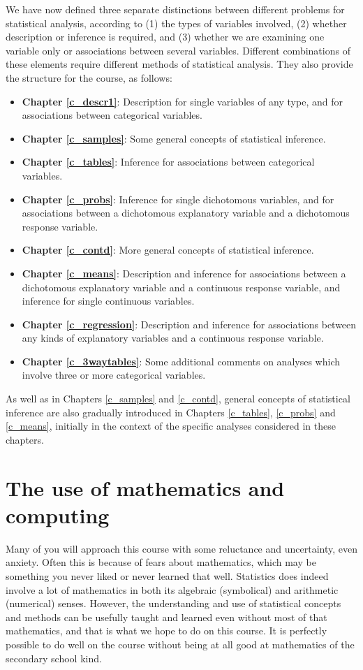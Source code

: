 We have now defined three separate distinctions between different
problems for statistical analysis, according to (1) the types of
variables involved, (2) whether description or inference is required,
and (3) whether we are examining one variable only or associations
between several variables. Different combinations of these elements
require different methods of statistical analysis. They also provide the
structure for the course, as follows:
\begin{itemize}
\item
\textbf{Chapter \ref{c_descr1}}: Description for single variables of any
type, and for associations between categorical variables.
\item
\textbf{Chapter \ref{c_samples}}: Some general concepts
of statistical inference.
\item
\textbf{Chapter \ref{c_tables}}:
Inference for associations between categorical variables.
\item
\textbf{Chapter \ref{c_probs}}:
Inference for single dichotomous variables, and
for associations between a dichotomous explanatory
variable and a dichotomous response variable.
\item
\textbf{Chapter \ref{c_contd}}: More general concepts
of statistical inference.
\item
\textbf{Chapter \ref{c_means}}:
Description and inference for associations between a
dichotomous explanatory
variable and a continuous response variable, and
inference for single continuous variables.
\item
\textbf{Chapter \ref{c_regression}}:
Description and inference for associations between any kinds of
explanatory variables and a continuous response variable.
\item
\textbf{Chapter \ref{c_3waytables}}: Some additional comments on analyses which
involve three or more categorical variables.
\end{itemize}
As well as in Chapters \ref{c_samples} and \ref{c_contd}, general
concepts of statistical inference are also gradually introduced in
Chapters \ref{c_tables}, \ref{c_probs} and \ref{c_means}, initially in
the context of the specific analyses considered in these chapters.

\section{The use of mathematics and computing}
\label{s_intro_maths}

Many of you will approach this course with some reluctance and
uncertainty, even anxiety. Often this is because of fears about
mathematics, which may be something you never liked or never learned
that well. Statistics does indeed involve a lot of mathematics in both
its algebraic (symbolical) and arithmetic (numerical) senses. However,
the understanding and use of statistical concepts and methods can be
usefully taught and learned even without most of that mathematics, and
that is what we hope to do on this course. It is perfectly possible to
do well on the course without being at all good at mathematics of the
secondary school kind.


